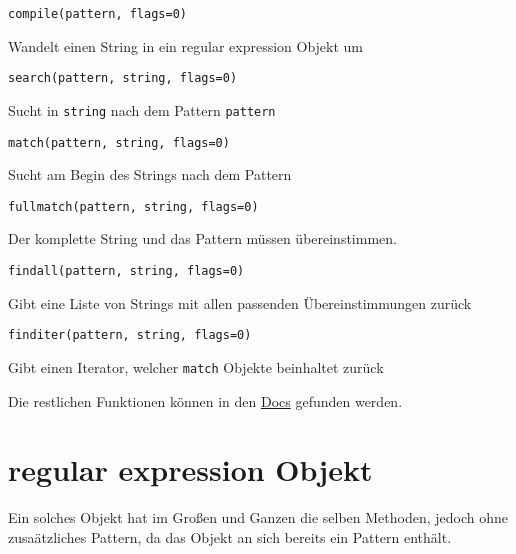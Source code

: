 \documentclass[ignorenonframetext,]{beamer}
\begin{document}
\begin{frame}[fragile]

\begin{verbatim}
compile(pattern, flags=0)
\end{verbatim}

Wandelt einen String in ein regular expression Objekt um

\begin{verbatim}
search(pattern, string, flags=0)
\end{verbatim}

Sucht in \texttt{string} nach dem Pattern \texttt{pattern}

\begin{verbatim}
match(pattern, string, flags=0)
\end{verbatim}

Sucht am Begin des Strings nach dem Pattern

\begin{verbatim}
fullmatch(pattern, string, flags=0)
\end{verbatim}

Der komplette String und das Pattern müssen übereinstimmen.

\end{frame}

\begin{frame}[fragile]

\begin{verbatim}
findall(pattern, string, flags=0)
\end{verbatim}

Gibt eine Liste von Strings mit allen passenden Übereinstimmungen zurück

\begin{verbatim}
finditer(pattern, string, flags=0)
\end{verbatim}

Gibt einen Iterator, welcher \texttt{match} Objekte beinhaltet zurück

Die restlichen Funktionen können in den
\href{https://docs.python.org/3/library/re.html}{Docs} gefunden werden.

\end{frame}

\section{regular expression Objekt}\label{regular-expression-objekt}

\begin{frame}

Ein solches Objekt hat im Großen und Ganzen die selben Methoden, jedoch
ohne zusaätzliches Pattern, da das Objekt an sich bereits ein Pattern
enthält.

\end{frame}
\end{document}
